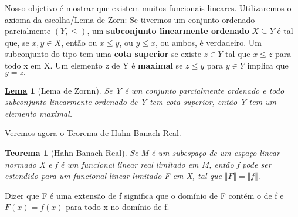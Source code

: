 \documentclass{article}
\newtheorem*{theorem*}{\underline{Teorema}}
\newtheorem*{lemma*}{\underline{Lema}}
\begin{document}
  Nosso objetivo é mostrar que existem muitos funcionais lineares. Utilizaremos o axioma da escolha/Lema de Zorn: Se tivermos um conjunto ordenado parcialmente \((Y, \leq )\), um \textbf{subconjunto linearmente ordenado} \(X\subseteq Y\) é tal que, se \(x, y\in X\), então ou \(x\leq y\), ou \(y \leq x\), ou ambos, é verdadeiro. 
Um subconjunto do tipo tem uma \textbf{cota superior} se existe \(z\in Y\) tal que \(x\leq z\) para todo x em X.  Um elemento z de Y é \textbf{maximal} se \(z \leq y\) para \(y\in Y\) implica que \(y = z.\)
  \hypertarget{zornn}{
    \begin{lemma*}[Lema de Zornn]
     Se Y é um conjunto parcialmente ordenado e todo subconjunto linearmente ordenado de Y tem cota superior, então Y tem um elemento maximal.
   \end{lemma*}
  }
  Veremos agora o Teorema de Hahn-Banach Real. 
  \hypertarget{real_hahn_banach}{
    \begin{theorem*}[Hahn-Banach Real]
      Se M é um subespaço de um espaço linear normado X e f é um funcional linear real limitado em M, então f pode ser estendido para um funcional linear limitado F em X, tal que \(\Vert F \Vert = \Vert f \Vert.\) 
   \end{theorem*}
  }
  Dizer que F é uma extensão de f significa que o domínio de F contém o de f e \(F(x) = f(x)\) para todo x no domínio de f.
\end{document}
